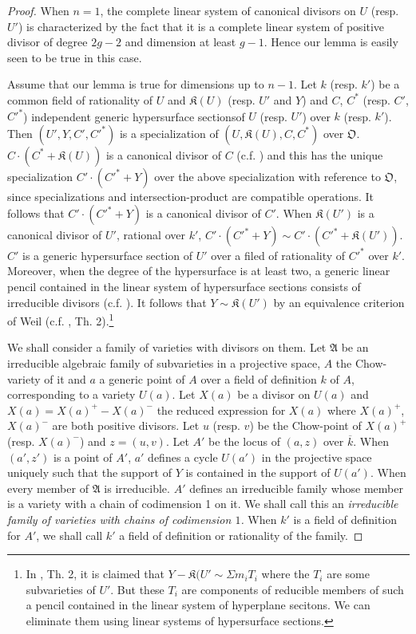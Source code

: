\begin{proof}
When $n=1$, the complete linear system of canonical divisors on $U$ (resp. $U'$) is characterized by the fact that it is a complete linear system of positive divisor of degree $2g-2$ and dimension at least $g-1$. Hence our lemma is easily seen to be true in this case.

Assume that our lemma is true for dimensions up to $n-1$. Let $k$ (resp. $k'$) be a common field of rationality of $U$ and $\mathfrak{K}(U)$ (resp. $U'$ and $Y$) and $C$, $C^{*}$ (resp. $C'$, ${C'}^{*}$) independent generic hypersurface sections\pageoriginale of $U$ (resp. $U'$) over $k$ (resp. $k'$). Then $(U',Y,C',{C'}^{*})$ is a specialization of $(U,\mathfrak{K}(U), C,C^{*})$ over $\mathfrak{O}$. $C\cdot (C^{*}+\mathfrak{K}(U))$ is a canonical divisor of $C$ (c.f. \cite{art14-key31}) and this has the unique specialization $C'\cdot ({C'}^{*}+Y)$ over the above specialization with reference to $\mathfrak{O}$, since specializations and intersection-product are compatible operations. It follows that $C'\cdot ({C'}^{*}+Y)$ is a canonical divisor of $C'$. When $\mathfrak{K}(U')$ is a canonical divisor of $U'$, rational over $k'$, $C'\cdot ({C'}^{*}+Y)\sim C'\cdot ({C'}^{*}+\mathfrak{K}(U'))$. $C'$ is a generic hypersurface section of $U'$ over a filed of rationality of ${C'}^{*}$ over $k'$. Moreover, when the degree of the hypersurface is at least two, a generic linear pencil contained in the linear system of hypersurface sections consists of irreducible divisors (c.f. \cite{art14-key19}). It follows that $Y\sim \mathfrak{K}(U')$ by an equivalence criterion of Weil (c.f. \cite{art14-27}, Th. 2).\footnote{In \cite{art14-key27}, Th. 2, it is claimed that $Y-\mathfrak{K}(U'\sim \Sigma m_{i}T_{i}$ where the $T_{i}$ are some subvarieties of $U'$. But these $T_{i}$ are components of reducible members of such a pencil contained in the linear system of hyperplane secitons. We can eliminate them using linear systems of hypersurface sections.}

We shall consider a family of varieties with divisors on them. Let $\mathfrak{A}$ be an irreducible algebraic family of subvarieties in a projective space, $A$ the Chow-variety of it and $a$ a generic point of $A$ over a field of definition $k$ of $A$, corresponding to a variety $U(a)$. Let $X(a)$ be a divisor on $U(a)$ and $X(a)=X(a)^{+}-X(a)^{-}$ the reduced expression for $X(a)$ where $X(a)^{+}$, $X(a)^{-}$ are both positive divisors. Let $u$ (resp. $v$) be the Chow-point of $X(a)^{+}$ (resp. $X(a)^{-}$) and $z=(u,v)$. Let $A'$ be the locus of $(a,z)$ over $\overline{k}$. When $(a',z')$ is a point of $A'$, $a'$ defines a cycle $U(a')$ in the projective space uniquely such that the support of $Y$ is contained in the support of $U(a')$. When every member of $\mathfrak{A}$ is irreducible. $A'$ defines an irreducible family whose member is a variety with a chain of codimension 1 on it. We shall call this an {\em irreducible family of varieties with chains of codimension $1$.} When $k'$ is a field of definition for $A'$, we shall call $k'$ a field of definition or rationality of the family.
\end{proof}

